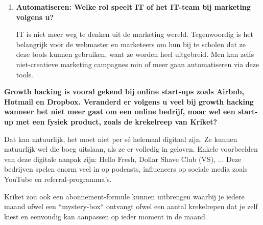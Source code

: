 \begin{enumerate}[label*=\arabic*.]
	Data verzamelen is de dag van vandaag zo makkelijk en uiteraard verschrikkelijk belangrijk, zeker wanneer men viraal gaat als bedrijf. Het belang van data is groot, maar het is wel dubbel.
	Men moet de data laten spreken, bijvoorbeeld bij een A/B-test\footnote{Bij A/B testen worden twee opties vergeleken bij een groep mensen, ieder krijgt ofwel A ofwel B en de conversies worden gebruikt als meetstaaf.}. Maar men moet niet verblind worden door de data, het grote geheel moet steeds bekeken worden. Soms zijn er andere factoren die de data hebben beïnvloed en die moeten natuurlijk worden meegenomen in het verhaal.
	
	Emotie is bijvoorbeeld iets dat moeilijk vatbaar is of ``brand awareness``, dit is niet makkelijk om te meten. Dit is duidelijk bij GDN (Google Display Network) banners. Wanneer men puur naar de cijfers kijkt, zijn GDN banners helemaal niet winstgevend. Hierbij moet men denken aan een groot reclamebord, dat is ook niet meteen winstgevend, maar het zorgt ervoor dat mensen het bedrijf leren kennen. Zo'n banners of reclameborden blijven de mensen wel bij en kan later, indirect, invloed hebben op de verkoop.
	
	\item \textbf{Automatiseren: Welke rol speelt IT of het IT-team bij marketing volgens u? }
	
	IT is niet meer weg te denken uit de marketing wereld. Tegenwoordig is het belangrijk voor de webmaster en marketeers om hun bij te scholen dat ze deze tools kunnen gebruiken, want ze worden heel uitgebreid. Men kan zelfs niet-creatieve marketing campagnes min of meer gaan automatiseren via deze tools. 
	
\end{enumerate}
\textbf{Growth hacking is vooral gekend bij online start-ups zoals Airbnb, Hotmail en Dropbox. Veranderd er volgens u veel bij growth hacking wanneer het niet meer gaat om een online bedrijf, maar wel een start-up met een fysiek product, zoals de krekelreep van Kriket?}

Dat kan natuurlijk, het moet niet per sé helemaal digitaal zijn. Ze kunnen natuurlijk wel die boeg uitslaan, als ze er volledig in geloven. Enkele voorbeelden van deze digitale aanpak zijn: Hello Fresh, Dollar Shave Club (VS), ... Deze bedrijven spelen enorm veel in op podcasts, influencers op sociale media zoals YouTube en referral-programma's. 

Kriket zou ook een abonnement-formule kunnen uitbrengen waarbij je iedere maand ofwel een ``mystery-box`` ontvangt ofwel een aantal krekelrepen dat je zelf kiest en eenvoudig kan aanpassen op ieder moment in de maand.


